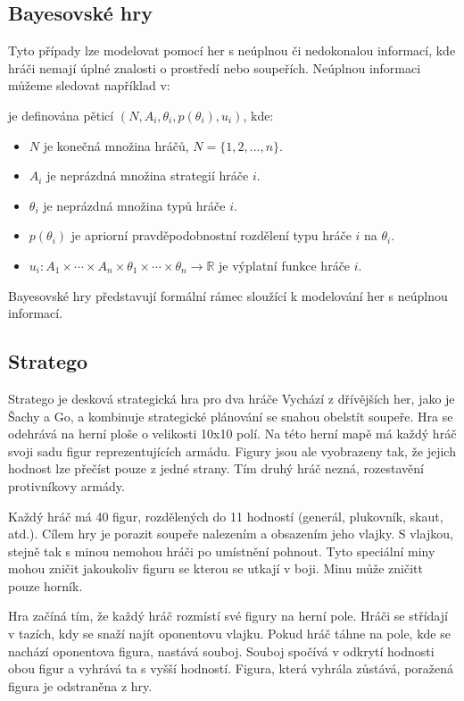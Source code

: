 \subsection{Bayesovské hry}
Tyto případy lze modelovat pomocí her s neúplnou či nedokonalou informací, kde hráči nemají úplné znalosti o prostředí nebo soupeřích.
Neúplnou informaci můžeme sledovat například v:

\begin{definition}
\cite{Y_Narahari} je definována pěticí $(N, A_i, \theta_i, p(\theta_i), u_i)$, kde:

\begin{itemize}
\item $N$ je konečná množina hráčů, $N = \{1, 2, \ldots, n\}$.
\item $A_i$ je neprázdná množina strategií hráče $i$.
\item $\theta_i$ je neprázdná množina typů hráče $i$.
\item $p(\theta_i)$ je apriorní pravděpodobnostní rozdělení typu hráče $i$ na $\theta_i$.
\item $u_i: A_1 \times \cdots \times A_n \times \theta_1 \times \cdots \times \theta_n \rightarrow \mathbb{R}$ je výplatní funkce hráče $i$.
\end{itemize}
\end{definition}

Bayesovské hry představují formální rámec sloužící k modelování her s neúplnou informací.

\subsection{Stratego}\label{subsec:stratego}
Stratego je desková strategická hra pro dva hráče
Vychází z dřívějších her, jako je Šachy a Go, a kombinuje strategické plánování se snahou obelstít soupeře.
Hra se odehrává na herní ploše o velikosti 10x10 polí.
Na této herní mapě má každý hráč svoji sadu figur reprezentujících armádu.
Figury jsou ale vyobrazeny tak, že jejich hodnost lze přečíst pouze z jedné strany.
Tím druhý hráč nezná, rozestavění protivníkovy armády.

Každý hráč má 40 figur, rozdělených do 11 hodností (generál, plukovník, skaut, atd.).
Cílem hry je porazit soupeře nalezením a obsazením jeho vlajky.
S vlajkou, stejně tak s minou nemohou hráči po umístnění pohnout.
Tyto speciální miny mohou zničit jakoukoliv figuru se kterou se utkají v boji.
Minu může zničitt pouze horník.

Hra začíná tím, že každý hráč rozmístí své figury na herní pole.
Hráči se střídají v tazích, kdy se snaží najít oponentovu vlajku.
Pokud hráč táhne na pole, kde se nachází oponentova figura, nastává souboj.
Souboj spočívá v odkrytí hodnosti obou figur a vyhrává ta s vyšší hodností.
Figura, která vyhrála zůstává, poražená figura je odstraněna z hry.

